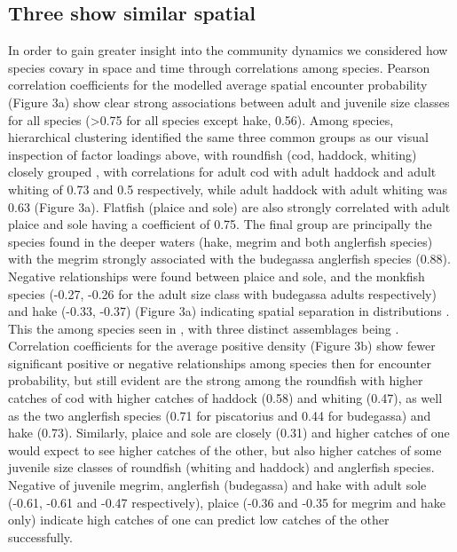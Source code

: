 \documentclass[fleqn,10pt]{wlscirep}
\begin{document}
\begin{linenumbers}
\subsection*{Three  show similar spatial
	\\} In order to gain greater
insight into the community dynamics we considered how species covary in space
and time through correlations among species.  Pearson correlation coefficients
for the modelled average spatial encounter probability (Figure 3a) show clear
strong associations between adult and juvenile size classes for all species
(\textgreater 0.75 for all species except hake, 0.56).  Among species,
hierarchical clustering identified the same three common
groups as our visual inspection of factor loadings
above, with roundfish (cod, haddock, whiting) closely grouped
, with correlations for adult cod with
adult haddock and adult whiting of 0.73 and 0.5 respectively, while adult
haddock with adult whiting was 0.63 (Figure 3a). Flatfish (plaice and sole) are
also strongly correlated with adult plaice and sole having a coefficient of
0.75.  The final group are principally the species found in the deeper waters
(hake, megrim and both anglerfish species) with the megrim strongly associated
with the budegassa anglerfish species (0.88). Negative relationships were found
between plaice and sole, and the monkfish species (-0.27, -0.26 for the adult
size class with budegassa adults respectively) and hake (-0.33, -0.37) (Figure
3a) indicating spatial separation in distributions . This
 the
 among species seen in
 , with three distinct assemblages being
.\\

Correlation coefficients for the average positive density (Figure 3b) show
fewer significant positive or negative relationships among species then for
encounter probability, but still evident are the strong
 among the roundfish with higher
catches of cod  
with higher catches of haddock (0.58) and whiting (0.47), as well as the two
anglerfish species (0.71 for piscatorius and 0.44 for budegassa) and hake
(0.73). Similarly, plaice and sole are closely
 (0.31) and higher catches of one would
expect to see higher catches of the other, but also higher catches of some
juvenile size classes of roundfish (whiting and haddock) and anglerfish
species. Negative  of juvenile
megrim, anglerfish (budegassa) and hake with adult sole (-0.61, -0.61 and -0.47
respectively), plaice (-0.36 and -0.35 for megrim and hake only) indicate high
catches of one can predict low catches of the other successfully.\\


\end{linenumbers}
\end{document}
